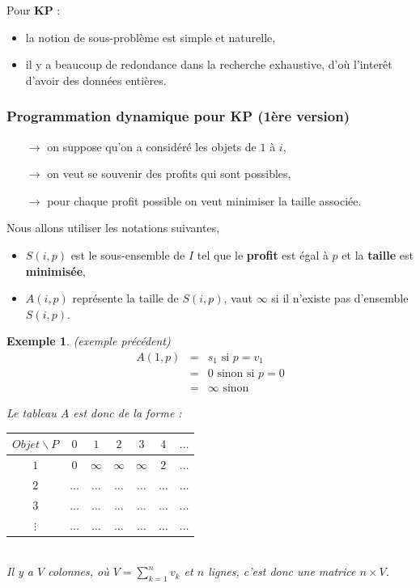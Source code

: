 \documentclass{article}
\newcommand{\titre}[1]{\textcolor{title}{#1}}
\newtheorem{exemple}{Exemple}[section]
\begin{document}
\begin{sffamily}
\noindent Pour \textbf{\titre{KP}} :
\begin{itemize}
\item la notion de sous-problème est simple et naturelle,
\item il y a beaucoup de redondance dans la recherche exhaustive, d'où l'interêt d'avoir des données entières.
\end{itemize}

\newpage

\subsubsection{Programmation dynamique pour \titre{KP} (1ère version)}
\begin{itemize}
\item[$\rightarrow$] on suppose qu'on a considéré les objets de $1$ à $i$,
\item[$\rightarrow$] on veut se souvenir des profits qui sont possibles,
\item[$\rightarrow$] pour chaque profit possible on veut minimiser la taille associée.
\end{itemize}

Nous allons utiliser les notations suivantes,
\begin{itemize}
\item $S(i,p)$ est le sous-ensemble de $I$ tel que le \textbf{profit} est égal à $p$ et la \textbf{taille} est \textbf{minimisée},
\item $A(i,p)$ représente la taille de $S(i,p)$, vaut $\infty$ si il n'existe pas d'ensemble $S(i,p)$.
\end{itemize}

\begin{exemple} \textit{(exemple précédent)}
\begin{eqnarray}
\nonumber A(1,p) & = & s_1 \text{ si }p=v_1 \\
\nonumber 	     & = & 0 \text{ sinon si } p = 0 \\
\nonumber 		 & = & \infty \text{ sinon}
\end{eqnarray}

\newpage

Le tableau $A$ est donc de la forme :
\begin{center}\begin{tabular}{c|cccccc}
$Objet\backslash P$ & $0$ & $1$ & $2$ & $3$ & $4$ & $\ldots$ \\
\hline
$1$ & $0$ & $\infty$ & $\infty$ & $\infty$ & $2$ & $\ldots$ \\
$2$ & $\ldots$ & $\ldots$ & $\ldots$ & $\ldots$ & $\ldots$ & $\ldots$ \\
$3$ & $\ldots$ & $\ldots$ & $\ldots$ & $\ldots$ & $\ldots$ & $\ldots$ \\
$\vdots$ & $\ldots$ & $\ldots$ & $\ldots$ & $\ldots$ & $\ldots$ & $\ldots$ \\
\end{tabular}\end{center}$ $\\
Il y a $V$ colonnes, où $V = \sum_{k=1}^n v_k$ et $n$ lignes, c'est donc une matrice $n\times V$.
\end{exemple}


\end{sffamily}
\end{document}
